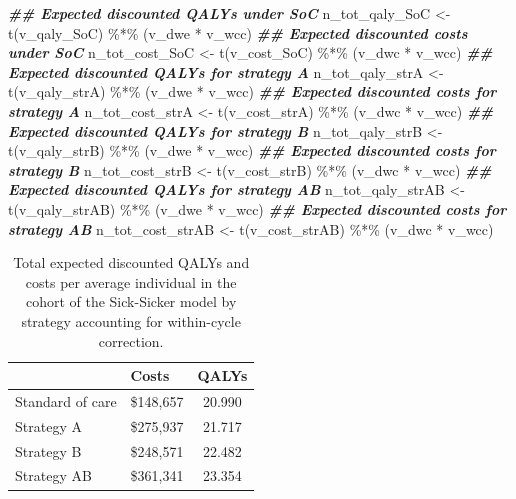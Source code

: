 \documentclass[
]{article}
\newenvironment{Shaded}{\begin{snugshade}}{\end{snugshade}}
\newcommand{\DocumentationTok}[1]{\textcolor[rgb]{0.56,0.35,0.01}{\textbf{\textit{#1}}}}
\newcommand{\FunctionTok}[1]{\textcolor[rgb]{0.00,0.00,0.00}{#1}}
\newcommand{\NormalTok}[1]{#1}
\newcommand{\OtherTok}[1]{\textcolor[rgb]{0.56,0.35,0.01}{#1}}
\newcommand{\SpecialCharTok}[1]{\textcolor[rgb]{0.00,0.00,0.00}{#1}}
\begin{document}
\begin{Shaded}
\begin{Highlighting}[]
\DocumentationTok{\#\# Expected discounted QALYs under SoC}
\NormalTok{n\_tot\_qaly\_SoC }\OtherTok{\textless{}{-}} \FunctionTok{t}\NormalTok{(v\_qaly\_SoC) }\SpecialCharTok{\%*\%}\NormalTok{ (v\_dwe }\SpecialCharTok{*}\NormalTok{ v\_wcc)}
\DocumentationTok{\#\# Expected discounted costs under SoC}
\NormalTok{n\_tot\_cost\_SoC }\OtherTok{\textless{}{-}} \FunctionTok{t}\NormalTok{(v\_cost\_SoC) }\SpecialCharTok{\%*\%}\NormalTok{ (v\_dwc }\SpecialCharTok{*}\NormalTok{ v\_wcc)}
\DocumentationTok{\#\# Expected discounted QALYs for strategy A}
\NormalTok{n\_tot\_qaly\_strA }\OtherTok{\textless{}{-}} \FunctionTok{t}\NormalTok{(v\_qaly\_strA) }\SpecialCharTok{\%*\%}\NormalTok{ (v\_dwe }\SpecialCharTok{*}\NormalTok{ v\_wcc)}
\DocumentationTok{\#\# Expected discounted costs for strategy A}
\NormalTok{n\_tot\_cost\_strA }\OtherTok{\textless{}{-}} \FunctionTok{t}\NormalTok{(v\_cost\_strA) }\SpecialCharTok{\%*\%}\NormalTok{ (v\_dwc }\SpecialCharTok{*}\NormalTok{ v\_wcc)}
\DocumentationTok{\#\# Expected discounted QALYs for strategy B}
\NormalTok{n\_tot\_qaly\_strB }\OtherTok{\textless{}{-}} \FunctionTok{t}\NormalTok{(v\_qaly\_strB) }\SpecialCharTok{\%*\%}\NormalTok{ (v\_dwe }\SpecialCharTok{*}\NormalTok{ v\_wcc)}
\DocumentationTok{\#\# Expected discounted costs for strategy B}
\NormalTok{n\_tot\_cost\_strB }\OtherTok{\textless{}{-}} \FunctionTok{t}\NormalTok{(v\_cost\_strB) }\SpecialCharTok{\%*\%}\NormalTok{ (v\_dwc }\SpecialCharTok{*}\NormalTok{ v\_wcc)}
\DocumentationTok{\#\# Expected discounted QALYs for strategy AB}
\NormalTok{n\_tot\_qaly\_strAB }\OtherTok{\textless{}{-}} \FunctionTok{t}\NormalTok{(v\_qaly\_strAB) }\SpecialCharTok{\%*\%}\NormalTok{ (v\_dwe }\SpecialCharTok{*}\NormalTok{ v\_wcc)}
\DocumentationTok{\#\# Expected discounted costs for strategy AB}
\NormalTok{n\_tot\_cost\_strAB }\OtherTok{\textless{}{-}} \FunctionTok{t}\NormalTok{(v\_cost\_strAB) }\SpecialCharTok{\%*\%}\NormalTok{ (v\_dwc }\SpecialCharTok{*}\NormalTok{ v\_wcc)}
\end{Highlighting}
\end{Shaded}

\begin{table}[!h]

\caption{\label{tab:Expected-outcomes-table}Total expected discounted QALYs and costs per average individual in the cohort of the Sick-Sicker model by strategy accounting for within-cycle correction.}
\centering
\begin{tabular}[t]{llc}
\toprule
  & Costs & QALYs\\
\midrule
Standard of care & \$148,657 & 20.990\\
Strategy A & \$275,937 & 21.717\\
Strategy B & \$248,571 & 22.482\\
Strategy AB & \$361,341 & 23.354\\
\bottomrule
\end{tabular}
\end{table}
\end{document}
